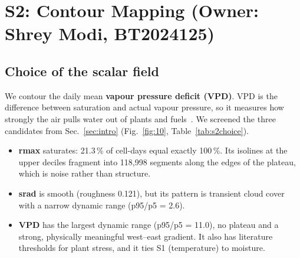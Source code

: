 \section{S2: Contour Mapping (Owner: Shrey Modi, BT2024125)}
\label{sec:s2}
\subsection{Choice of the scalar field}
We contour the daily mean \textbf{vapour pressure deficit (VPD)}. VPD is the difference between saturation and actual vapour
pressure, so it measures how strongly the air pulls water out of plants and fuels~\cite{novick2016,williams2019}. We screened
the three candidates from Sec.~\ref{sec:intro} (Fig.~\ref{fig:10}, Table~\ref{tab:s2choice}).
\begin{itemize}
\item \textbf{rmax} saturates: 21.3\,\% of cell-days equal exactly 100\,\%. Its isolines at the upper deciles fragment into
  118,998 segments along the edges of the plateau, which is noise rather than structure.
\item \textbf{srad} is smooth (roughness 0.121), but its pattern is transient cloud cover with a narrow dynamic range
  (p95/p5 = 2.6).
\item \textbf{VPD} has the largest dynamic range (p95/p5 = 11.0), no plateau and a strong, physically meaningful
  west--east gradient. It also has literature thresholds for plant stress, and it ties S1 (temperature) to moisture.
\end{itemize}




